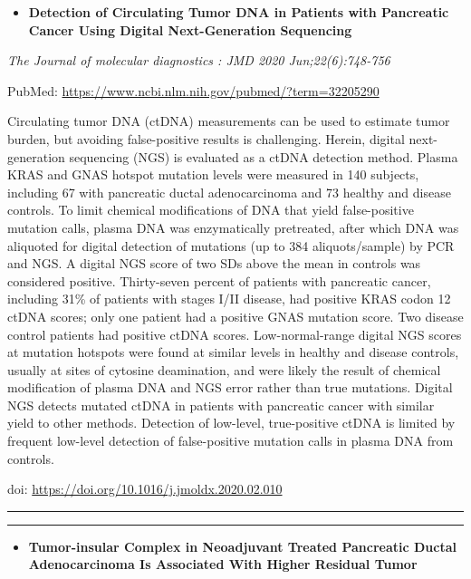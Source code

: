 \documentclass[
]{article}
\providecommand{\tightlist}{%
  \setlength{\itemsep}{0pt}\setlength{\parskip}{0pt}}
\begin{document}
\begin{itemize}
\tightlist
\item
  \textbf{Detection of Circulating Tumor DNA in Patients with Pancreatic
  Cancer Using Digital Next-Generation Sequencing}
\end{itemize}

\emph{The Journal of molecular diagnostics : JMD 2020 Jun;22(6):748-756}

PubMed: \url{https://www.ncbi.nlm.nih.gov/pubmed/?term=32205290}

Circulating tumor DNA (ctDNA) measurements can be used to estimate tumor
burden, but avoiding false-positive results is challenging. Herein,
digital next-generation sequencing (NGS) is evaluated as a ctDNA
detection method. Plasma KRAS and GNAS hotspot mutation levels were
measured in 140 subjects, including 67 with pancreatic ductal
adenocarcinoma and 73 healthy and disease controls. To limit chemical
modifications of DNA that yield false-positive mutation calls, plasma
DNA was enzymatically pretreated, after which DNA was aliquoted for
digital detection of mutations (up to 384 aliquots/sample) by PCR and
NGS. A digital NGS score of two SDs above the mean in controls was
considered positive. Thirty-seven percent of patients with pancreatic
cancer, including 31\% of patients with stages I/II disease, had
positive KRAS codon 12 ctDNA scores; only one patient had a positive
GNAS mutation score. Two disease control patients had positive ctDNA
scores. Low-normal-range digital NGS scores at mutation hotspots were
found at similar levels in healthy and disease controls, usually at
sites of cytosine deamination, and were likely the result of chemical
modification of plasma DNA and NGS error rather than true mutations.
Digital NGS detects mutated ctDNA in patients with pancreatic cancer
with similar yield to other methods. Detection of low-level,
true-positive ctDNA is limited by frequent low-level detection of
false-positive mutation calls in plasma DNA from controls.

doi: \url{https://doi.org/10.1016/j.jmoldx.2020.02.010}

\begin{center}\rule{0.5\linewidth}{0.5pt}\end{center}

\begin{center}\rule{0.5\linewidth}{0.5pt}\end{center}

\begin{itemize}
\tightlist
\item
  \textbf{Tumor-insular Complex in Neoadjuvant Treated Pancreatic Ductal
  Adenocarcinoma Is Associated With Higher Residual Tumor}
\end{itemize}
\end{document}
